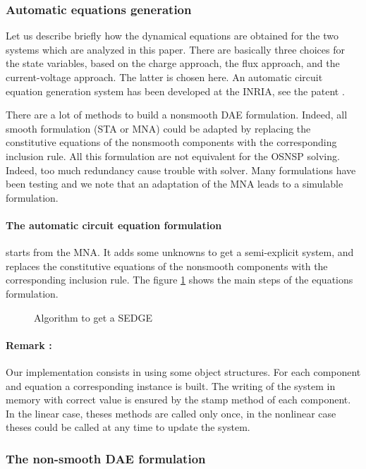 \documentclass{article}
\begin{document}
\subsubsection{Automatic equations generation}

Let us describe briefly how the dynamical equations are obtained for the two systems which are analyzed in this paper. There are basically three choices for the state variables, based on the charge approach, the flux approach, and the current-voltage approach. The latter is chosen here. An automatic circuit equation generation system has been developed at the INRIA, see the patent \cite{}. 

There are a lot of methods to build a nonsmooth DAE formulation. Indeed, all smooth formulation 
(STA or MNA) could be adapted by replacing the constitutive equations of the nonsmooth components
with the corresponding inclusion rule. All this formulation are not equivalent for the OSNSP
solving. Indeed, too much redundancy cause trouble with solver. Many formulations have been testing
and we note that an adaptation of the MNA leads to a simulable formulation.

\paragraph{The automatic circuit equation formulation} starts from the MNA. It adds some unknowns to
get a semi-explicit system, and replaces the constitutive equations of the nonsmooth components with
the corresponding inclusion rule. The figure \ref{fig:acef_algo} shows the main steps of the
equations formulation.

\begin{figure}[h]
  \centering
  \scalebox{0.5}{
  
  }
  \caption{Algorithm to get a SEDGE}
  \label{fig:acef_algo}
\end{figure}

\paragraph{Remark :} Our implementation consists in using some object structures. For each component
and equation a corresponding instance is built. The writing of the system in memory with correct value is ensured by the stamp method of each component. In the linear
case, theses methods are called only once, in the nonlinear case theses could be called at any time to update the system.


\subsubsection{The non-smooth DAE formulation}
\end{document}
